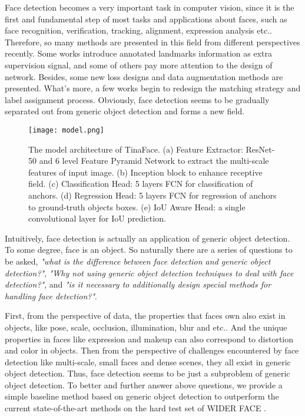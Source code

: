 \documentclass[final]{cvpr}
\begin{document}
Face detection becomes a very important task in computer vision, since it is the first and fundamental step of most tasks and applications about faces, such as face recognition, verification, tracking, alignment, expression analysis etc.. Therefore, so many methods are presented in this field from different perspectives recently. Some works \cite{deng2019retinaface, earp2019face, yashunin2020maskface} introduce annotated landmarks information as extra supervision signal, and some of others \cite{zhang2020asfd, zhang2020refineface, tang2018pyramidbox, li2019pyramidbox++, Najibi_2017_ICCV, Najibi_2019_CVPR, zhang2017s3fd} pay more attention to the design of network. Besides, some new loss designs \cite{zhang2020asfd, zhang2020refineface, Li_2019_CVPR} and data augmentation methods \cite{li2019pyramidbox++, tang2018pyramidbox} are presented. What's more, a few works \cite{Liu_2020_CVPR, zhang2017s3fd} begin to redesign the matching strategy and label assignment process. Obviously, face detection seems to be gradually separated out from generic object detection and forms a new field.

\begin{figure*}[t]
\centering
  \texttt{[image: model.png]}
\centering
\caption{The model architecture of TinaFace. (a) Feature Extractor: ResNet-50 \cite{he2016deep} and 6 level Feature Pyramid Network \cite{lin2017feature} to extract the multi-scale features of input image. (b) Inception block to enhance receptive field. (c) Classification Head: 5 layers FCN for classification of anchors. (d) Regression Head: 5 layers FCN for regression of anchors to ground-truth objects boxes. (e) IoU Aware Head: a single convolutional layer for IoU prediction.}
\label{fig1}
\end{figure*}

Intuitively, face detection is actually an application of generic object detection. To some degree, face is an object. So naturally there are a series of questions to be asked, \textit{"what is the difference between face detection and generic object detection?"}, \textit{"Why not using generic object detection techniques to deal with face detection?"}, and \textit{"is it necessary to additionally design special methods for handling face detection?"}.

First, from the perspective of data, the properties that faces own also exist in objects, like pose, scale, occlusion, illumination, blur and etc.. And the unique properties in faces like expression and makeup can also correspond to distortion and color in objects. Then from the perspective of challenges encountered by face detection like multi-scale, small faces and dense scenes, they all exist in generic object detection. Thus, face detection seems to be just a subproblem of generic object detection. To better and further answer above questions, we provide a simple baseline method based on generic object detection to outperform the current state-of-the-art methods on the hard test set of WIDER FACE \cite{yang2016wider}.
\end{document}
